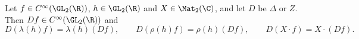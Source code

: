 Let $f\in C^\infty(\GL_2(\R))$, $h\in\GL_2(\R)$ and $X\in\Mat_2(\C)$, and let $D$ be $\Delta$ or $Z$. Then
$Df\in C^\infty(\GL_2(\R))$ and
\[
  D(\lambda(h)f)=\lambda(h)(Df),\qquad D(\rho(h)f)=\rho(h)(Df),\qquad D(X\cdot f)=X\cdot(Df).
\]
